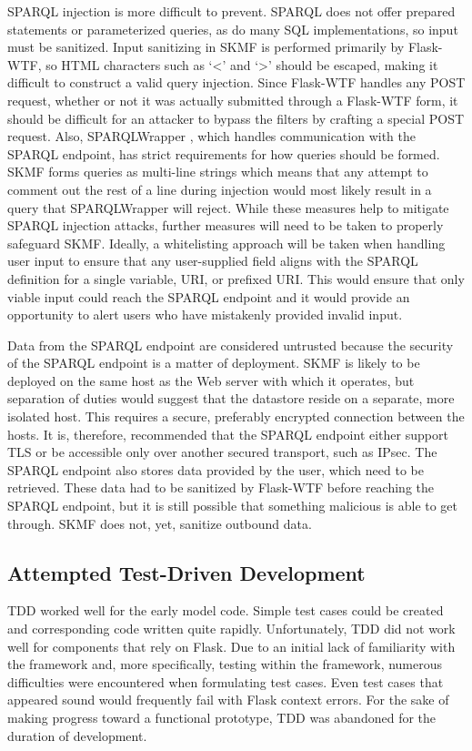 SPARQL injection is more difficult to prevent. SPARQL does not offer prepared statements or parameterized queries, as do many SQL implementations, so input must be sanitized. Input sanitizing in SKMF is performed primarily by Flask-WTF, so HTML characters such as `\textless' and `\textgreater' should be escaped, making it difficult to construct a valid query injection. Since Flask-WTF handles any POST request, whether or not it was actually submitted through a Flask-WTF form, it should be difficult for an attacker to bypass the filters by crafting a special POST request. Also, SPARQLWrapper
\cite{sparqlwrapper},
which handles communication with the SPARQL endpoint, has strict requirements for how queries should be formed. SKMF forms queries as multi-line strings which means that any attempt to comment out the rest of a line during injection would most likely result in a query that SPARQLWrapper will reject. While these measures help to mitigate SPARQL injection attacks, further measures will need to be taken to properly safeguard SKMF. Ideally, a whitelisting approach will be taken when handling user input to ensure that any user-supplied field aligns with the SPARQL definition for a single variable, URI, or prefixed URI. This would ensure that only viable input could reach the SPARQL endpoint and it would provide an opportunity to alert users who have mistakenly provided invalid input.

Data from the SPARQL endpoint are considered untrusted because the security of the SPARQL endpoint is a matter of deployment. SKMF is likely to be deployed on the same host as the Web server with which it operates, but separation of duties would suggest that the datastore reside on a separate, more isolated host. This requires a secure, preferably encrypted connection between the hosts. It is, therefore, recommended that the SPARQL endpoint either support TLS or be accessible only over another secured transport, such as IPsec. The SPARQL endpoint also stores data provided by the user, which need to be retrieved. These data had to be sanitized by Flask-WTF before reaching the SPARQL endpoint, but it is still possible that something malicious is able to get through. SKMF does not, yet, sanitize outbound data.


\subsection{Attempted Test-Driven Development}
\label{method:tdd}

TDD worked well for the early model code. Simple test cases could be created and corresponding code written quite rapidly. Unfortunately, TDD did not work well for components that rely on Flask. Due to an initial lack of familiarity with the framework and, more specifically, testing within the framework, numerous difficulties were encountered when formulating test cases. Even test cases that appeared sound would frequently fail with Flask context errors. For the sake of making progress toward a functional prototype, TDD was abandoned for the duration of development.

